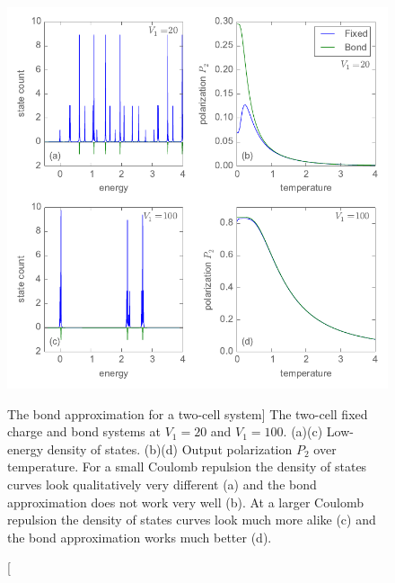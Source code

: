 \begin{figure}
  \center
  \includegraphics{bond_approximation2}
  \caption
  [The bond approximation for a two-cell system]
  {
  The two-cell fixed charge and bond systems at $V_1 = 20$ and $V_1 = 100$.
  (a)(c) Low-energy density of states. (b)(d) Output polarization $P_2$ over
  temperature. For a small Coulomb repulsion the density of states curves look
  qualitatively very different (a) and the bond approximation does not work very
  well (b). At a larger Coulomb repulsion the density of states curves look much
  more alike (c) and the bond approximation works much better (d).
  }
  \label{fig:bond_approximation2}
\end{figure}


